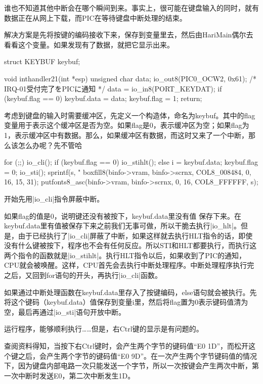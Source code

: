 谁也不知道其他中断会在哪个瞬间到来。事实上，很可能在键盘输入的同时，就有数据正在从网上下载，而PIC在等待键盘中断处理的结束。

\cs

解决方案是先将按键的编码接收下来，保存到变量里去，然后由HariMain偶尔去看看这个变量。如果发现有了数据，就把它显示出来。

\begin{code}
struct KEYBUF keybuf;

void inthandler21(int *esp)
{
	unsigned char data;
	io_out8(PIC0_OCW2, 0x61);	/* IRQ-01受付完了をPICに通知 */
	data = io_in8(PORT_KEYDAT);
	if (keybuf.flag == 0) {
		keybuf.data = data;
		keybuf.flag = 1;
	}
	return;
}
\end{code}

考虑到键盘的输入时需要缓冲区，先定义一个构造体，命名为keybuf。其中的flag变量用于表示这个缓冲区是否为空。如果flag是0，表示缓冲区为空；如果flag为1，表示缓冲区中有数据。那么，如果缓冲区有数据，而这时又来了一个中断，那么该怎么办呢？先不管哈~

\cs

\begin{code}[label=bootpack.c中HariMain函数节选]
for (;;) {
		io_cli();
		if (keybuf.flag == 0) {
			io_stihlt();
		} else {
			i = keybuf.data;
			keybuf.flag = 0;
			io_sti();
			sprintf(s, "%
			boxfill8(binfo->vram, binfo->scrnx, COL8_008484, 0, 16, 15, 31);
			putfonts8_asc(binfo->vram, binfo->scrnx, 0, 16, COL8_FFFFFF, s);
		}
	}
\end{code}
开始先用|io_cli|指令屏蔽中断。

如果flag的值是0，说明键还没有被按下，keybuf.data里没有值 保存下来。在keybuf.data里有值被保存下来之前我们无事可做，所以干脆去执行|io_hlt|。但是，由于已经执行了|io_cli|屏蔽了中断，如果这样就去执行HLT指令的话，即使没有什么键被按下，程序也不会有任何反应。所以STI和HLT都要执行，而执行这两个指令的函数就是|io_stihlt|。执行HLT指令以后，如果收到了PIC的通知，CPU就会被唤醒。这样，CPU首先会去执行中断处理程序。中断处理程序执行完之后，又回到for语句的开头，再执行|io_cli|函数。

如果通过中断处理函数在keybuf.data里存入了按键编码，else语句就会被执行。先将这个键码（keybuf.data）值保存到变量i里，然后将flag置为0表示键码值清为空，最后再通过|io_sti|语句开放中断。

\cs

运行程序，能够顺利执行……但是，右Ctrl键的显示是有问题的。

查阅资料得知，当按下右Ctrl键时，会产生两个字节的键码值“E0 1D”，而松开这个键之后，会产生两个字节的键码值“E0 9D”。在一次产生两个字节键码值的情况下，因为键盘内部电路一次只能发送一个字节，所以一次按键会产生两次中断，第一次中断时发送E0，第二次中断发生1D。

